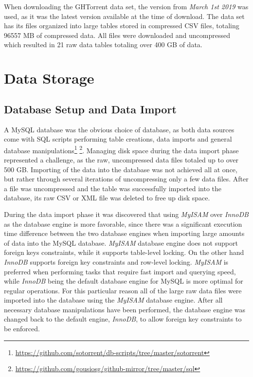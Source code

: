         When downloading the GHTorrent data set, the version from \textit{March 1st 2019} was used, as it was the latest version available at the time of download. The data set has its files organized into large tables stored in compressed CSV files, totaling 96557 MB of compressed data. All files were downloaded and uncompressed which resulted in 21 raw data tables totaling over 400 GB of data.

\section{Data Storage}

    \subsection{Database Setup and Data Import}

        
        A MySQL database was the obvious choice of database, as both data sources come with SQL scripts performing table creations, data imports and general database manipulations\footnote{\label{SO_sql} \url{https://github.com/sotorrent/db-scripts/tree/master/sotorrent}} \footnote{\label{GH_sql} \url{https://github.com/gousiosg/github-mirror/tree/master/sql}}. Managing disk space during the data import phase represented a challenge, as the raw, uncompressed data files totaled up to over 500 GB. Importing of the data into the database was not achieved all at once, but rather through several iterations of uncompressing only a few data files. After a file was uncompressed and the table was successfully imported into the database, its raw CSV or XML file was deleted to free up disk space. 
        
        During the data import phase it was discovered that using \textit{MyISAM} over \textit{InnoDB} as the database engine is more favorable, since there was a significant execution time difference between the two database engines when importing large amounts of data into the MySQL database. \textit{MyISAM} database engine does not support foreign keys constraints, while it supports table-level locking. On the other hand \textit{InnoDB} supports foreign key constraints and row-level locking. \textit{MyISAM} is preferred when performing tasks that require fast import and querying speed, while \textit{InnoDB} being the default database engine for MySQL is more optimal for regular operations. For this particular reason all of the large raw data files were imported into the database using the \textit{MyISAM} database engine. After all necessary database manipulations have been performed, the database engine was changed back to the default engine, \textit{InnoDB}, to allow foreign key constraints to be enforced. 
     
